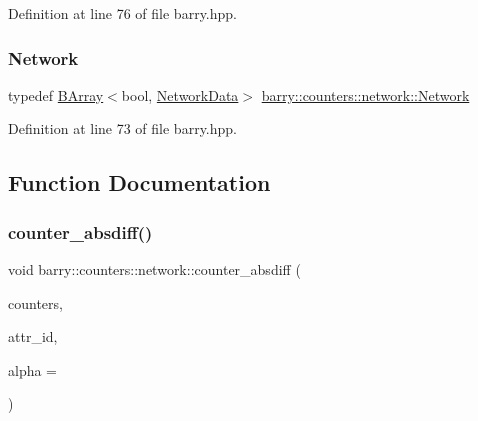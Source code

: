 Definition at line 76 of file barry.\+hpp.

\mbox{\label{namespacebarry_1_1counters_1_1network_a4cb88d4572ded3b447ea269c9cd0b2c0}} 
\subsubsection{\texorpdfstring{Network}{Network}}
{\footnotesize\ttfamily typedef \hyperlink{classbarry_1_1_b_array}{B\+Array}$<$bool, \hyperlink{classbarry_1_1counters_1_1network_1_1_network_data}{Network\+Data}$>$ \hyperlink{namespacebarry_1_1counters_1_1network_a4cb88d4572ded3b447ea269c9cd0b2c0}{barry\+::counters\+::network\+::\+Network}}



Definition at line 73 of file barry.\+hpp.



\subsection{Function Documentation}
\mbox{\label{namespacebarry_1_1counters_1_1network_acc210d80021cb5a79f1a9daf097e1c99}} 
\subsubsection{\texorpdfstring{counter\+\_\+absdiff()}{counter\_absdiff()}}
{\footnotesize\ttfamily void barry\+::counters\+::network\+::counter\+\_\+absdiff (\begin{DoxyParamCaption}\item[{\hyperlink{namespacebarry_1_1counters_1_1network_a3b3c590303d47840d1967372ae495d95}{Net\+Counter\+Vector} $\ast$}]{counters,  }\item[{\hyperlink{namespacebarry_a11dfc53ddb4672278319aa04f1e09a6c}{uint}}]{attr\+\_\+id,  }\item[{double}]{alpha = {} }\end{DoxyParamCaption})\hspace{0.3cm}{\ttfamily [inline]}}



